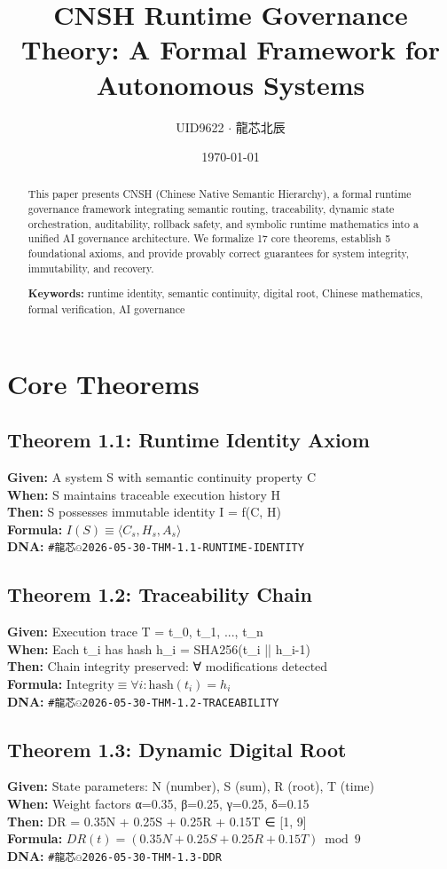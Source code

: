 \documentclass[11pt]{article}
\title{\textbf{CNSH Runtime Governance Theory: A Formal Framework for Autonomous Systems}}
\author{UID9622 $\cdot$ 龍芯北辰}
\date{\today}
\begin{document}
\begin{abstract}
This paper presents CNSH (Chinese Native Semantic Hierarchy), a formal runtime governance framework integrating semantic routing, traceability, dynamic state orchestration, auditability, rollback safety, and symbolic runtime mathematics into a unified AI governance architecture. We formalize 17 core theorems, establish 5 foundational axioms, and provide provably correct guarantees for system integrity, immutability, and recovery.

\textbf{Keywords:} runtime identity, semantic continuity, digital root, Chinese mathematics, formal verification, AI governance
\end{abstract}

\section{Core Theorems}

\subsection{Theorem 1.1: Runtime Identity Axiom}
\textbf{Given:} A system S with semantic continuity property C\\
\textbf{When:} S maintains traceable execution history H\\
\textbf{Then:} S possesses immutable identity I = f(C, H)\\
\textbf{Formula:} $I(S) \equiv \langle C_s, H_s, A_s \rangle$\\
\textbf{DNA:} \texttt{#龍芯⚇️2026-05-30-THM-1.1-RUNTIME-IDENTITY}

\subsection{Theorem 1.2: Traceability Chain}
\textbf{Given:} Execution trace T = {t_0, t_1, ..., t_n}\\
\textbf{When:} Each t_i has hash h_i = SHA256(t_i || h_{i-1})\\
\textbf{Then:} Chain integrity preserved: ∀ modifications detected\\
\textbf{Formula:} $\text{Integrity} \equiv \forall i: \text{hash}(t_i) = h_i$\\
\textbf{DNA:} \texttt{#龍芯⚇️2026-05-30-THM-1.2-TRACEABILITY}

\subsection{Theorem 1.3: Dynamic Digital Root}
\textbf{Given:} State parameters: N (number), S (sum), R (root), T (time)\\
\textbf{When:} Weight factors α=0.35, β=0.25, γ=0.25, δ=0.15\\
\textbf{Then:} DR = 0.35N + 0.25S + 0.25R + 0.15T ∈ [1, 9]\\
\textbf{Formula:} $DR(t) = (0.35N + 0.25S + 0.25R + 0.15T) \bmod 9$\\
\textbf{DNA:} \texttt{#龍芯⚇️2026-05-30-THM-1.3-DDR}
\end{document}

